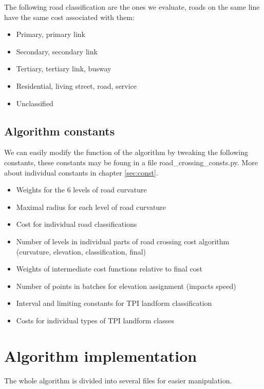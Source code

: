 \documentclass[oneside]{article}
\begin{document}
        \noindent The following road classification are the ones we evaluate, roads on the same line have the same cost associated with them:
        \begin{itemize}
            \item Primary, primary link
            \item Secondary, secondary link
            \item Tertiary, tertiary link, busway
            \item Residential, living street, road, service
            \item Unclassified
        \end{itemize}

        \subsection{Algorithm constants}
        We can easily modify the function of the algorithm by tweaking the following constants, these constants may be foung in a file road\_crossing\_consts.py. More about individual constants in chapter \ref{sec:const}.
        \begin{itemize}
            \item Weights for the 6 levels of road curvature
            \item Maximal radius for each level of road curvature
            \item Cost for individual road classifications
            \item Number of levels in individual parts of road crossing cost algorithm (curvature, elevation, classification, final)
            \item Weights of intermediate cost functions relative to final cost
            \item Number of points in batches for elevation assignment (impacts speed)
            \item Interval and limiting constants for TPI landform classification
            \item Costs for individual types of TPI landform classes
        \end{itemize}

    \newpage
    \section{Algorithm implementation}
    The whole algorithm is divided into several files for easier manipulation.
\end{document}
